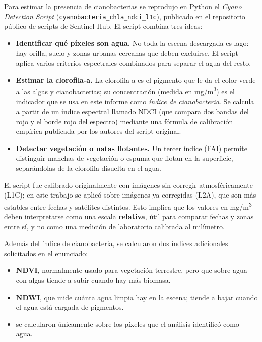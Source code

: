 \documentclass[11pt]{article}
\begin{document}
Para estimar la presencia de cianobacterias se reprodujo en Python el \emph{Cyano Detection Script} (\texttt{cyanobacteria\_chla\_ndci\_l1c}), publicado en el repositorio p\'ublico de scripts de Sentinel Hub. El script combina tres ideas:

\begin{itemize}
    \item \textbf{Identificar qu\'e p\'ixeles son agua.} No toda la escena descargada es lago: hay orilla, suelo y zonas urbanas cercanas que deben excluirse. El script aplica varios criterios espectrales combinados para separar el agua del resto.
    \item \textbf{Estimar la clorofila-a.} La clorofila-a es el pigmento que le da el color verde a las algas y cianobacterias; su concentraci\'on (medida en mg/m\textsuperscript{3}) es el indicador que se usa en este informe como \emph{\'indice de cianobacteria}. Se calcula a partir de un \'indice espectral llamado NDCI (que compara dos bandas del rojo y el borde rojo del espectro) mediante una f\'ormula de calibraci\'on emp\'irica publicada por los autores del script original.
    \item \textbf{Detectar vegetaci\'on o natas flotantes.} Un tercer \'indice (FAI) permite distinguir manchas de vegetaci\'on o espuma que flotan en la superficie, separ\'andolas de la clorofila disuelta en el agua.
\end{itemize}

El script fue calibrado originalmente con im\'agenes sin corregir atmosf\'ericamente (L1C); en este trabajo se aplic\'o sobre im\'agenes ya corregidas (L2A), que son m\'as estables entre fechas y sat\'elites distintos. Esto implica que los valores en mg/m\textsuperscript{3} deben interpretarse como una escala \textbf{relativa}, \'util para comparar fechas y zonas entre s\'i, y no como una medici\'on de laboratorio calibrada al mil\'imetro.

Adem\'as del \'indice de cianobacteria, se calcularon dos \'indices adicionales solicitados en el enunciado:

\begin{itemize}
    \item \textbf{NDVI}, normalmente usado para vegetaci\'on terrestre, pero que sobre agua con algas tiende a subir cuando hay m\'as biomasa.
    \item \textbf{NDWI}, que mide cu\'anta agua limpia hay en la escena; tiende a bajar cuando el agua est\'a cargada de pigmentos.
    \item se calcularon \'unicamente sobre los p\'ixeles que el an\'alisis identific\'o como agua.
\end{itemize}
\end{document}
